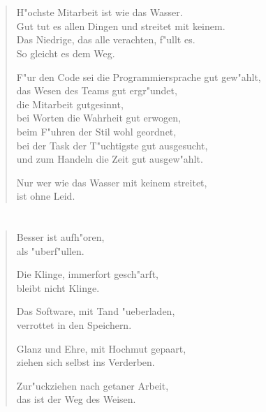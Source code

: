 \documentclass[a4paper,10pt,openany]{book}
\begin{document}
\chapter{}
\begin{verse}
H"ochste Mitarbeit ist wie das Wasser.\\
Gut tut es allen Dingen und streitet mit keinem.\\
Das Niedrige, das alle verachten, f"ullt es.\\
So gleicht es dem Weg.

F"ur den Code sei die Programmiersprache gut gew"ahlt,\\
das Wesen des Teams gut ergr"undet,\\
die Mitarbeit gutgesinnt,\\
bei Worten die Wahrheit gut erwogen,\\
beim F"uhren der Stil wohl geordnet,\\
bei der Task der T"uchtigste gut ausgesucht,\\
und zum Handeln die Zeit gut ausgew"ahlt.

Nur wer wie das Wasser mit keinem streitet,\\
ist ohne Leid.
\end{verse}

\chapter{}
\begin{verse}
    Besser ist aufh"oren,\\
    als "uberf"ullen.

    Die Klinge, immerfort gesch"arft,\\
    bleibt nicht Klinge.

    Das Software, mit Tand "ueberladen,\\
    verrottet in den Speichern.

    Glanz und Ehre, mit Hochmut gepaart,\\
    ziehen sich selbst ins Verderben.

    Zur"uckziehen nach getaner Arbeit,\\
    das ist der Weg des Weisen.
\end{verse}
\end{document}
